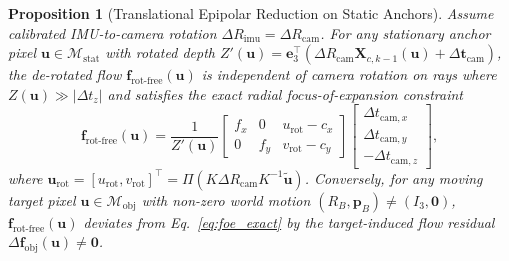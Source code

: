 \documentclass[journal]{IEEEtran}
\newtheorem{proposition}{Proposition}
\begin{document}
\begin{proposition}[Translational Epipolar Reduction on Static Anchors]
\label{prop:epipolar}
Assume calibrated IMU-to-camera rotation $\Delta R_{\text{imu}} = \Delta R_{\text{cam}}$. For any stationary anchor pixel $\mathbf{u} \in \mathcal{M}_{\text{stat}}$ with rotated depth $Z'(\mathbf{u}) = \mathbf{e}_3^\top(\Delta R_{\text{cam}}\mathbf{X}_{c,k-1}(\mathbf{u}) + \Delta\mathbf{t}_{\text{cam}})$, the de-rotated flow $\mathbf{f}_{\text{rot-free}}(\mathbf{u})$ is independent of camera rotation on rays where $Z(\mathbf{u}) \gg |\Delta t_z|$ and satisfies the exact radial focus-of-expansion constraint
\begin{equation}
\mathbf{f}_{\text{rot-free}}(\mathbf{u}) = \frac{1}{Z'(\mathbf{u})} \begin{bmatrix} f_x & 0 & u_{\text{rot}} - c_x \\ 0 & f_y & v_{\text{rot}} - c_y \end{bmatrix} \begin{bmatrix} \Delta t_{\text{cam},x} \\ \Delta t_{\text{cam},y} \\ -\Delta t_{\text{cam},z} \end{bmatrix},
\label{eq:foe_exact}
\end{equation}
where $\mathbf{u}_{\text{rot}} = [u_{\text{rot}}, v_{\text{rot}}]^\top = \Pi(K\Delta R_{\text{cam}}K^{-1}\tilde{\mathbf{u}})$. Conversely, for any moving target pixel $\mathbf{u} \in \mathcal{M}_{\text{obj}}$ with non-zero world motion $(R_B, \mathbf{p}_B) \neq (I_3, \mathbf{0})$, $\mathbf{f}_{\text{rot-free}}(\mathbf{u})$ deviates from Eq.~\eqref{eq:foe_exact} by the target-induced flow residual $\Delta\mathbf{f}_{\text{obj}}(\mathbf{u}) \neq \mathbf{0}$.
\end{proposition}
\end{document}
